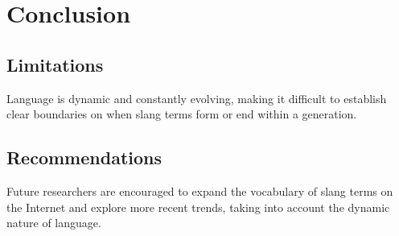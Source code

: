 \chapter{Conclusion}

\section{Limitations}
Language is dynamic and constantly evolving, making it difficult to establish clear boundaries on when slang terms form or end within a generation.
\section{Recommendations}
Future researchers are encouraged to expand the vocabulary of slang terms on the Internet and explore more recent trends, taking into account the dynamic nature of language.